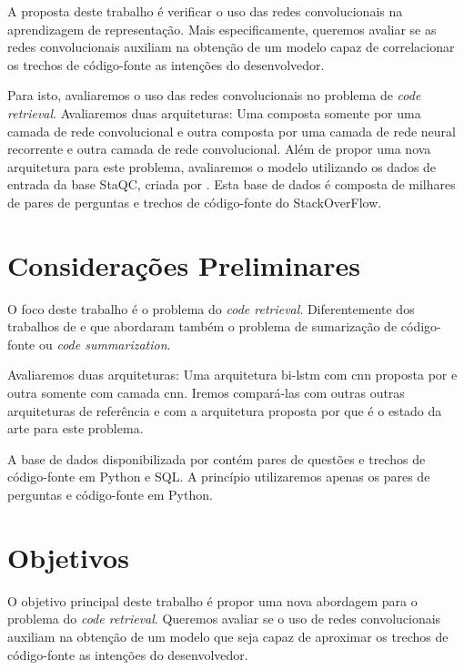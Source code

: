 A proposta deste trabalho é verificar o uso das redes convolucionais na aprendizagem de representação. Mais especificamente, queremos avaliar se as redes convolucionais auxiliam na obtenção de um modelo capaz de correlacionar os trechos de código-fonte as intenções do desenvolvedor.

Para isto, avaliaremos o uso das redes convolucionais no problema de \textit{code retrieval}. Avaliaremos duas arquiteturas: Uma composta somente por uma camada de rede convolucional e outra composta por uma camada de rede neural recorrente e outra camada de rede convolucional. Além de propor uma nova arquitetura para este problema, avaliaremos o modelo utilizando os dados de entrada da base StaQC, criada por \cite{yao-2018}. Esta base de dados é composta de milhares de pares de perguntas e trechos de código-fonte do StackOverFlow.



\section{Considerações Preliminares}
\label{sec:consideracoes_preliminares}

O foco deste trabalho é o problema do \textit{code retrieval}. Diferentemente dos trabalhos de \cite{iyer-etal-2016-summarizing} e \cite{Allamanis-bimodal-source-code-natural-language:2015} que abordaram também o problema de sumarização de código-fonte ou \textit{code summarization}. 

Avaliaremos duas arquiteturas: Uma arquitetura bi-\acrshort{lstm} com \acrshort{cnn} proposta por \cite{tan-lstm-qa} e outra somente com camada \acrshort{cnn}. Iremos compará-las com outras outras arquiteturas de referência e com a arquitetura proposta por \cite{cambronero-deep-learning-code-search:2019} que é o estado da arte para este problema.

A base de dados disponibilizada por \cite{yao-2018} contém pares de questões e trechos de código-fonte em Python e SQL. A princípio utilizaremos apenas os pares de perguntas e código-fonte em Python.


\section{Objetivos}
\label{sec:objetivo}

O objetivo principal deste trabalho é propor uma nova abordagem para o problema do \textit{code retrieval}. Queremos avaliar se o uso de redes convolucionais auxiliam na obtenção de um modelo que seja capaz de aproximar os trechos de código-fonte as intenções do desenvolvedor.

